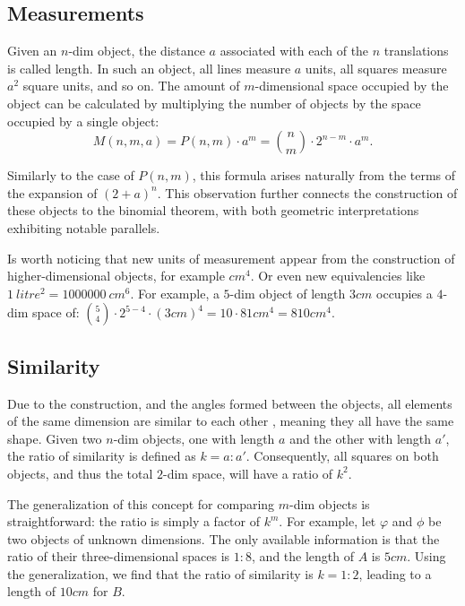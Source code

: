 \documentclass{article}
\begin{document}
	\subsection{Measurements}
	
	Given an $n$-dim object, the distance $a$ associated with each of the $n$ translations is called length. In such an object, all lines measure $a$ units, all squares measure $a^{2}$ square units, and so on. The amount of $m$-dimensional space occupied by the object can be calculated by multiplying the number of objects by the space occupied by a single object:
	$$M(n,m,a) = P(n,m) \cdot a^{m} = \binom{n}{m} \cdot 2^{n-m} \cdot a^{m}.$$
	
	Similarly to the case of $P(n,m)$, this formula arises naturally from the terms of the expansion of $(2 + a)^{n}$. This observation further connects the construction of these objects to the binomial theorem, with both geometric interpretations exhibiting notable parallels.
	
	Is worth noticing that new units of measurement appear from the construction of higher-dimensional objects, for example $cm^{4}$. Or even new equivalencies like $1\ litre^{2} = 1000000\ cm^{6}$. For example, a $5$-dim object of length $3cm$ occupies a $4$-dim space of: $\binom{5}{4} \cdot 2^{5-4} \cdot (3cm)^{4} = 10 \cdot  81 cm^{4} = 810 cm^{4}$.
	
	\subsection{Similarity}
	
	Due to the construction, and the angles formed between the objects, all elements of the same dimension are similar to each other \cite{euclid}, meaning they all have the same shape. Given two $n$-dim objects, one with length $a$ and the other with length $a'$, the ratio of similarity \cite{euclid} is defined as $k = a:a'$. Consequently, all squares on both objects, and thus the total $2$-dim space, will have a ratio of $k^{2}$.
	
	The generalization of this concept for comparing $m$-dim objects is straightforward: the ratio is simply a factor of $k^m$. For example, let $\varphi$ and $\phi$ be two objects of unknown dimensions. The only available information is that the ratio of their three-dimensional spaces is $1:8$, and the length of $A$ is $5cm$. Using the generalization, we find that the ratio of similarity is $k = 1:2$, leading to a length of $10cm$ for $B$.
	
\end{document}
